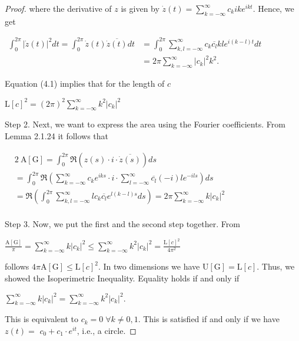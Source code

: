 \documentclass[a4paper]{book}
\numberwithin{theorem}{section}%
\begin{document}
\begin{proof}
    where the derivative of $z$ is given by $\displaystyle \dot{z}(t)=\sum_{k=-\infty}^{\infty} c_k i k e^{i k t}$. Hence, we get
    \begin{center}
        $\displaystyle \begin{aligned}\int_0^{2 \pi}|\dot{z}(t)|^2 d t=\int_0^{2 \pi} \dot{z}(t) \overline{\dot{z}(t)} d t & =\int_0^{2 \pi} \sum_{k,l=-\infty}^{\infty} c_k\overline{c_l}kle^{i(k-l)t}dt\\&=2\pi \sum_{k=-\infty}^{\infty}\left|c_k\right|^2 k^2.\end{aligned}$
    \end{center}

    Equation (4.1) implies that for the length of $c$
    \begin{center}
        $\displaystyle \mathrm{L}[c]^2=(2 \pi)^2 \sum_{k=-\infty}^{\infty} k^2\left|c_k\right|^2$
    \end{center}

    Step 2. Next, we want to express the area using the Fourier coefficients. From Lemma 2.1.24 it follows that
    \begin{center}
        $\displaystyle \begin{aligned}&2\mathrm{~A}[\mathrm{G}]=\int_0^{2 \pi} \Re(z(s) \cdot i \cdot \overline{\dot{z}(s)}) d s \\&=\int_0^{2 \pi} \Re\left(\sum_{k=-\infty}^{\infty} c_k e^{i k s} \cdot i \cdot \sum_{l=-\infty}^{\infty} \overline{c_l}(-i) l e^{-i l s}\right) d s \\& =\Re\left(\int_0^{2 \pi} \sum_{k, l=-\infty}^{\infty} l c_k \overline{c_l} e^{l(k-l) s} d s\right)=2 \pi \sum_{k=-\infty}^{\infty} k\left|c_k\right|^2 \\&\end{aligned}$
    \end{center}

    Step 3. Now, we put the first and the second step together. From
    \begin{center}
        $\displaystyle \frac{\mathrm{A}[\mathrm{G}]}{\pi}=\sum_{k=-\infty}^{\infty} k\left|c_k\right|^2 \leq \sum_{k=-\infty}^{\infty} k^2\left|c_k\right|^2=\frac{\mathrm{L}[c]^2}{4 \pi^2}$
    \end{center}

    follows $4 \pi \mathrm{A}[\mathrm{G}] \leq \mathrm{L}[c]^2$. In two dimensions we have $\mathrm{U}[\mathrm{G}]=\mathrm{L}[c]$. Thus, we showed the Isoperimetric Inequality. Equality holds if and only if
    \begin{center}
        $\displaystyle \sum_{k=-\infty}^{\infty} k\left|c_k\right|^2=\sum_{k=-\infty}^{\infty} k^2\left|c_k\right|^2 .$
    \end{center}

    This is equivalent to $c_k=0\; \forall k \neq 0,1$. This is satisfied if and only if we have $z(t)=$ $c_0+c_1 \cdot e^{i t}$, i.e., a circle.
\end{proof}
\end{document}
